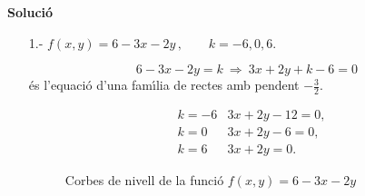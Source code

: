 \documentclass[12pt]{article}
\newcommand{\solucio}{\textbf{Soluci{\'o}}\ \ }
\begin{document}
\solucio
\begin{itemize}
\item[1.-] $f(x,y)=6-3x-2y\,,\qquad k=-6,0,6$.

  \[
6-3x-2y=k\ \Longrightarrow\  3x+2y+k-6=0
  \]
  {\'e}s l'equaci{\'o} d'una fam{\'\i}lia de rectes amb pendent
  $-\frac{3}{2}$.

\begin{align*}
  & k=-6 & 3x+2y-12=0, \\
  & k=0 & 3x+2y-6=0,\\
  & k=6 & 3x+2y=0.
\end{align*}
\begin{figure}[h!]
\begin{center}
\vspace{-.4cm}
\end{center}\caption{Corbes de nivell de la funci{\'o}  $f(x,y)=6-3x-2y$}
\end{figure}

%
%

%
%


\end{itemize}
\end{document}
